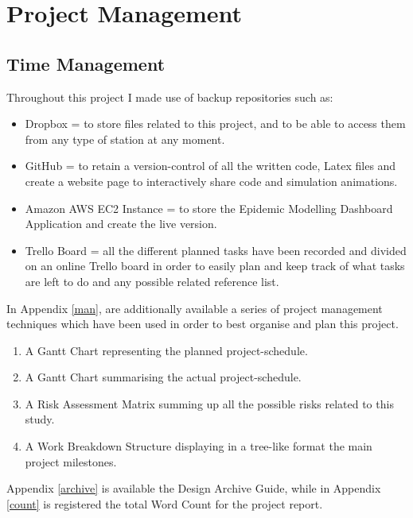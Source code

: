 \chapter{Project Management}

\label{ch:management}
\setlength\lineskip{0pt}
\vspace*{15pt}

\section{Time Management}
Throughout this project I made use of backup repositories such as:

\begin{itemize}
\itemsep0em
\item Dropbox = to store files related to this project, and to be able to access them from any type of station at any moment.
\item GitHub = to retain a version-control of all the written code, Latex files and create a website page to interactively share code and simulation animations.
\item Amazon AWS EC2 Instance = to store the Epidemic Modelling Dashboard Application and create the live version.
\item Trello Board = all the different planned tasks have been recorded and divided on an online Trello board in order to easily plan and keep track of what tasks are left to do and any possible related reference list.
\end{itemize}

In Appendix \ref{man}, are additionally available a series of project management techniques which have been used in order to best organise and plan this project.

\begin{enumerate}
\itemsep0em
\item A Gantt Chart representing the planned project-schedule.
\item A Gantt Chart summarising the actual project-schedule.
\item A Risk Assessment Matrix summing up all the possible risks related to this study.
\item A Work Breakdown Structure displaying in a tree-like format the main project milestones. 
\end{enumerate}

Appendix \ref{archive} is available the Design Archive Guide, while in Appendix \ref{count} is registered the total Word Count for the project report.

